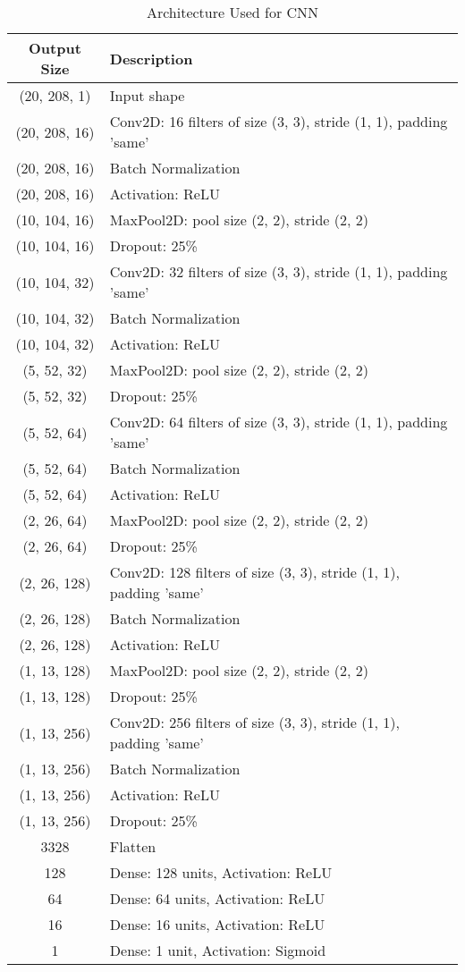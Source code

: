 \begin{table}[!h]
  \small %
  \setlength{\tabcolsep}{7pt} %
  \renewcommand{\arraystretch}{1.2} %
  \caption{Architecture Used for CNN}
  \label{tab:reduced}
  \begin{tabular}{|c|p{5.5cm}|}
    \hline
    \textbf{Output Size} & \textbf{Description} \\
    \hline
    (20, 208, 1) & Input shape \\
    (20, 208, 16) & Conv2D: 16 filters of size (3, 3), stride (1, 1), padding 'same' \\
    (20, 208, 16) & Batch Normalization \\
    (20, 208, 16) & Activation: ReLU \\
    (10, 104, 16) & MaxPool2D: pool size (2, 2), stride (2, 2) \\
    (10, 104, 16) & Dropout: 25\% \\
    (10, 104, 32) & Conv2D: 32 filters of size (3, 3), stride (1, 1), padding 'same' \\
    (10, 104, 32) & Batch Normalization \\
    (10, 104, 32) & Activation: ReLU \\
    (5, 52, 32) & MaxPool2D: pool size (2, 2), stride (2, 2) \\
    (5, 52, 32) & Dropout: 25\% \\
    (5, 52, 64) & Conv2D: 64 filters of size (3, 3), stride (1, 1), padding 'same' \\
    (5, 52, 64) & Batch Normalization \\
    (5, 52, 64) & Activation: ReLU \\
    (2, 26, 64) & MaxPool2D: pool size (2, 2), stride (2, 2) \\
    (2, 26, 64) & Dropout: 25\% \\
    (2, 26, 128) & Conv2D: 128 filters of size (3, 3), stride (1, 1), padding 'same' \\
    (2, 26, 128) & Batch Normalization \\
    (2, 26, 128) & Activation: ReLU \\
    (1, 13, 128) & MaxPool2D: pool size (2, 2), stride (2, 2) \\
    (1, 13, 128) & Dropout: 25\% \\
    (1, 13, 256) & Conv2D: 256 filters of size (3, 3), stride (1, 1), padding 'same' \\
    (1, 13, 256) & Batch Normalization \\
    (1, 13, 256) & Activation: ReLU \\
    (1, 13, 256) & Dropout: 25\% \\
    3328 & Flatten \\
    128 & Dense: 128 units, Activation: ReLU \\
    64 & Dense: 64 units, Activation: ReLU \\
    16 & Dense: 16 units, Activation: ReLU \\
    1 & Dense: 1 unit, Activation: Sigmoid \\
    \hline
  \end{tabular}
\end{table}
